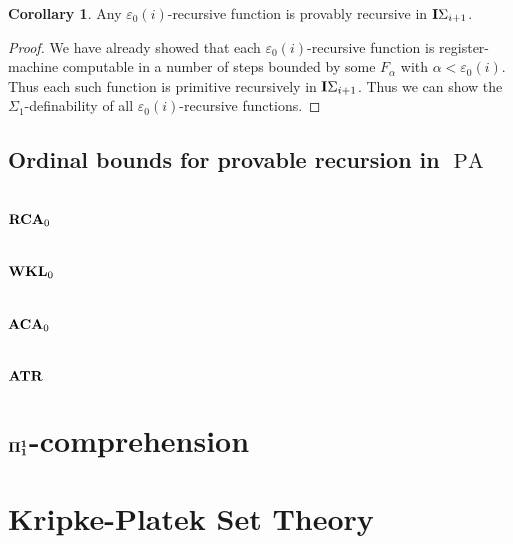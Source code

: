\documentclass[8pt]{article}
\theoremstyle{definition}
\theoremstyle{definition}
\theoremstyle{definition}
\theoremstyle{definition}
\theoremstyle{definition}
\theoremstyle{definition}
\theoremstyle{definition}
\theoremstyle{definition}
\theoremstyle{definition}
\theoremstyle{definition}
\theoremstyle{definition}
\theoremstyle{definition}
\theoremstyle{definition}
\newtheorem{col}{Corollary}[section]
\theoremstyle{question}
\begin{document}
\begin{col}
  Any $\varepsilon_0(i)$-recursive function is provably recursive in ${\bf I}\Sigma_{i + 1}$.
\end{col}

\begin{proof}
  We have already showed that each $\varepsilon_0(i)$-recursive function is register-machine computable
  in a number of steps bounded by some $F_{\alpha}$ with $\alpha < \varepsilon_0(i)$.
  Thus each such function is primitive recursively in ${\bf I}\Sigma_{i + 1}$. Thus we can show the
  $\Sigma_1$-definability of all $\varepsilon_0(i)$-recursive functions.
\end{proof}

\subsection{Ordinal bounds for provable recursion in $\operatorname{PA}$}

\section{${\bf RCA}_0$}

\section{${\bf WKL}_0$}

\section{${\bf ACA}_0$}

\section{${\bf ATR}$}

\section{${\bf \Pi_1^1}$-comprehension}

\section{Kripke-Platek Set Theory}




\end{document}
